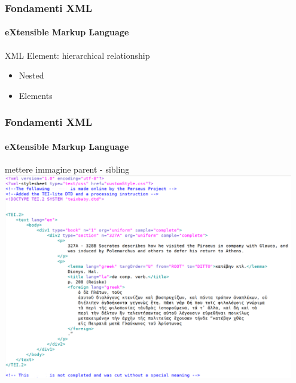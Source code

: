 \begin{frame}
    \frametitle{Fondamenti XML}
    \framesubtitle{eXtensible Markup Language}
    \addtocounter{nframe}{1}

	\begin{block}{XML Element: hierarchical relationship}
		\begin{itemize}
			\item Nested %
			\item Elements %
		\end{itemize}
	\end{block}

\end{frame}

\begin{frame}
	\frametitle{Fondamenti XML}
	\framesubtitle{eXtensible Markup Language}
	\addtocounter{nframe}{1}

	\begin{center}
		mettere immagine parent - sibling
		\includegraphics[width=0.95\textwidth]{imgs/xml-TEI-PerseusExample.png}
	\end{center}

\end{frame}


